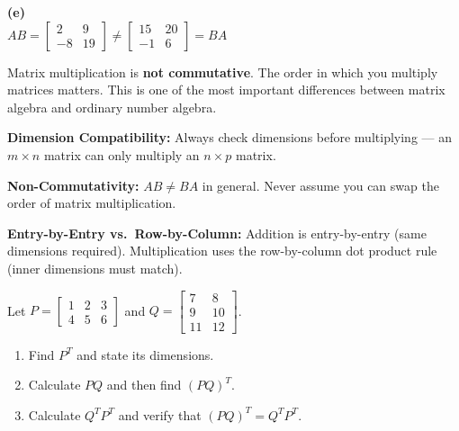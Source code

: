 \begin{solution}
\medskip
\textbf{(e)} \\
$AB = \begin{bmatrix} 2 & 9 \\ -8 & 19 \end{bmatrix} \neq \begin{bmatrix} 15 & 20 \\ -1 & 6 \end{bmatrix} = BA$

\medskip
Matrix multiplication is \textbf{not commutative}. The order in which you multiply matrices matters. This is one of the most important differences between matrix algebra and ordinary number algebra.
\end{solution}

\begin{takeaways}
\item \textbf{Dimension Compatibility:} Always check dimensions before multiplying --- an $m \times n$ matrix can only multiply an $n \times p$ matrix.
\item \textbf{Non-Commutativity:} $AB \neq BA$ in general. Never assume you can swap the order of matrix multiplication.
\item \textbf{Entry-by-Entry vs.\ Row-by-Column:} Addition is entry-by-entry (same dimensions required). Multiplication uses the row-by-column dot product rule (inner dimensions must match).
\end{takeaways}

\bigskip

\begin{problem}
Let $P = \begin{bmatrix} 1 & 2 & 3 \\ 4 & 5 & 6 \end{bmatrix}$ and $Q = \begin{bmatrix} 7 & 8 \\ 9 & 10 \\ 11 & 12 \end{bmatrix}$.

\begin{enumerate}[label=\textbf{(\alph*)}]
  \item Find $P^T$ and state its dimensions.
  \item Calculate $PQ$ and then find $(PQ)^T$.
  \item Calculate $Q^T P^T$ and verify that $(PQ)^T = Q^T P^T$.
\end{enumerate}
\end{problem}

